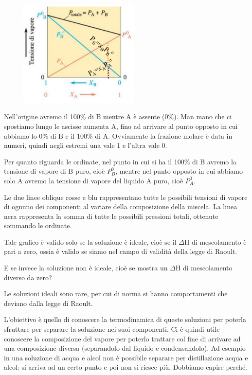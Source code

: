 \begin{minipage}{0.4\textwidth}
    \begin{figure}[H]
        \includegraphics[width=6cm]{immagini/tensione_di_vapore_sol_ideale.png}
    \end{figure}
\end{minipage}
\begin{minipage}{0.6\textwidth}
    Nell'origine avremo il 100\% di B mentre A è assente (0\%). Man mano che ci spostiamo lungo le ascisse aumenta A, fino ad arrivare al punto opposto in cui abbiamo lo 0\% di B e il 100\% di A. Ovviamente la frazione molare è data in numeri, quindi negli estremi una vale 1 e l'altra vale 0.

    Per quanto riguarda le ordinate, nel punto in cui si ha il 100\% di B avremo la tensione di vapore di B puro, cioè $P^0_B$, mentre nel punto opposto in cui abbiamo solo A avremo la tensione di vapore del liquido A puro, cioè $P^0_A$.
\end{minipage}

Le due linee oblique rosse e blu rappresentano tutte le possibili tensioni di vapore di ognuno dei componenti al variare della composizione della miscela. La linea nera rappresenta la somma di tutte le possibili pressioni totali, ottenute sommando le ordinate.

Tale grafico è valido solo se la soluzione è ideale, cioè se il $\Delta$H di mescolamento è pari a zero, ossia è valido se siamo nel campo di validità della legge di Raoult.

\vspace{0.2cm}E se invece la soluzione non è ideale, cioè se mostra un $\Delta$H di mescolamento diverso da zero?

Le soluzioni ideali sono rare, per cui di norma si hanno comportamenti che deviano dalla legge di Raoult.

L'obiettivo è quello di conoscere la termodinamica di queste soluzioni per poterla sfruttare per separare la soluzione nei suoi componenti. Ci è quindi utile conoscere la composizione del vapore per poterlo trattare col fine di arrivare ad una composizione diversa (separandolo dal liquido e condensandolo). Ad esempio in una soluzione di acqua e alcol non è possibile separare per distillazione acqua e alcol: si arriva ad un certo punto e poi non si riesce più. Dobbiamo capire perché.

